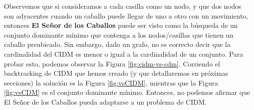 \documentclass[a4paper]{article}
\begin{document}
Observemos que si consideramos a cada casilla como un nodo, y que dos nodos son adyacentes cuando un caballo puede llegar de uno a otro con un movimiento, entonces {\bf El Señor de los Caballos} puede ser visto como la búsqueda de un conjunto dominante mínimo que contenga a los nodos/casillas que tienen un caballo preubicado. Sin embargo, dado un grafo, no es correcto decir que la cardinalidad del CIDM es menor o igual a la cardinalidad de un conjunto. Para probar esto, podemos observar la Figura \ref{fig:cidm-vs-cdm}. Corriendo el backtracking de CIDM que hemos creado (y que detallaremos en próximas secciones) la solución es la Figura \ref{fig:vsCIDM}, mientras que la Figura \ref{fig:vsCDM} es el conjunto dominante mínimo. Entonces, no podemos afirmar que El Señor de los Caballos pueda adaptarse a un problema de CIDM. 
\end{document}
